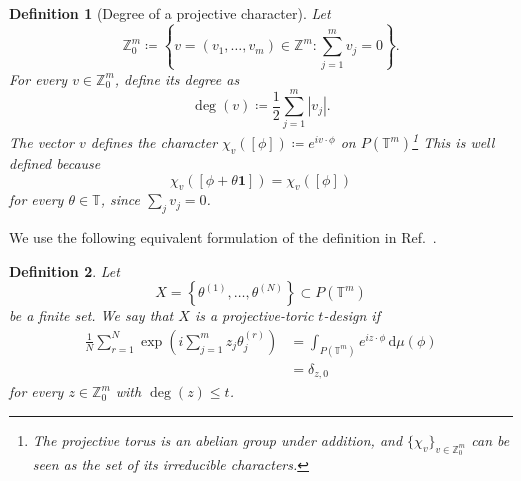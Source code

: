 \documentclass[aps,twocolumn,pra,superscriptaddress,nofootinbib]{revtex4-2}
\newtheorem{definition}{Definition}
\begin{document}
\begin{definition}[Degree of a projective character]
Let
\begin{equation}
    \mathbb{Z}_{0}^{m}
    \coloneqq
    \left\{
        v=(v_{1},\ldots,v_{m})\in\mathbb{Z}^{m}
        :
        \sum_{j=1}^{m}v_{j}=0
    \right\}.
\end{equation}
For every $v\in\mathbb{Z}_{0}^{m}$, define its degree as
\begin{equation}
    \deg(v)
    \coloneqq
    \frac{1}{2}\sum_{j=1}^{m}|v_{j}|.
\end{equation}
The vector $v$ defines the character
$\chi_{v}([\phi])\coloneqq e^{i v\cdot\phi}$ on
$P(\mathbb{T}^{m})$\footnote{The projective torus is an abelian group under addition, and $\{\chi_v\}_{v\in\mathbb Z_0^m}$ can be seen as the set of its irreducible characters.} This is well defined because
\begin{equation}
    \chi_{v}([\phi+\theta\mathbf{1}])
    =
    \chi_{v}([\phi])
\end{equation}
for every $\theta\in\mathbb{T}$, since $\sum_{j}v_{j}=0$.
\end{definition}
We use the following equivalent formulation of the definition in
Ref.~\cite{IosueEtAl2024}.


\begin{definition}
\label{def:projective-toric-design}
Let
\begin{equation}
    X =\left\{
        \theta^{(1)},\ldots,\theta^{(N)}
    \right\}\subset P(\mathbb{T}^{m})
\end{equation}
be a finite set. We say that $X$ is a
projective-toric $t$-design if
\begin{align}
    \frac{1}{N}\sum_{r=1}^{N} 
    \exp\left(
        i\sum_{j=1}^{m}z_{j}\theta_{j}^{(r)}
    \right)
    &=\int_{P(\mathbb{T}^{m})}
    e^{i z\cdot\phi}\,
    \mathrm{d}\mu(\phi)\nonumber\\
    &=\delta_{z,0}
\end{align}
for every $z\in\mathbb{Z}_{0}^{m}$ with $\deg(z)\leq t$.
\end{definition}
\end{document}
